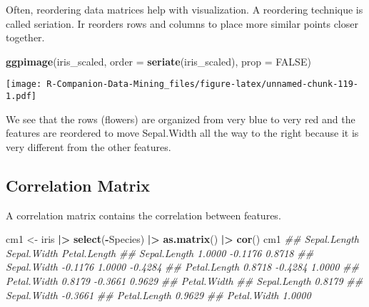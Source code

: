 \documentclass[
  notitlepage]{book}
\newenvironment{Shaded}{\begin{snugshade}}{\end{snugshade}}
\newcommand{\CommentTok}[1]{\textcolor[rgb]{0.56,0.35,0.01}{\textit{#1}}}
\newcommand{\DataTypeTok}[1]{\textcolor[rgb]{0.13,0.29,0.53}{#1}}
\newcommand{\ErrorTok}[1]{\textcolor[rgb]{0.64,0.00,0.00}{\textbf{#1}}}
\newcommand{\KeywordTok}[1]{\textcolor[rgb]{0.13,0.29,0.53}{\textbf{#1}}}
\newcommand{\NormalTok}[1]{#1}
\newcommand{\OperatorTok}[1]{\textcolor[rgb]{0.81,0.36,0.00}{\textbf{#1}}}
\newcommand{\OtherTok}[1]{\textcolor[rgb]{0.56,0.35,0.01}{#1}}
\newcommand{\StringTok}[1]{\textcolor[rgb]{0.31,0.60,0.02}{#1}}
\begin{document}
Often, reordering data matrices help with visualization. A reordering
technique is called seriation. Ir reorders rows and columns to place
more similar points closer together.

\begin{Shaded}
\begin{Highlighting}[]
\KeywordTok{ggpimage}\NormalTok{(iris\_scaled, }\DataTypeTok{order =} \KeywordTok{seriate}\NormalTok{(iris\_scaled), }\DataTypeTok{prop =} \OtherTok{FALSE}\NormalTok{)}
\end{Highlighting}
\end{Shaded}

\texttt{[image: R-Companion-Data-Mining\_files/figure-latex/unnamed-chunk-119-1.pdf]}

We see that the rows (flowers) are organized from very blue to very red
and the features are reordered to move Sepal.Width all the way to the
right because it is very different from the other features.

\hypertarget{correlation-matrix}{%
\subsection{Correlation Matrix}\label{correlation-matrix}}

A correlation matrix contains the correlation between features.

\begin{Shaded}
\begin{Highlighting}[]
\NormalTok{cm1 \textless{}{-}}\StringTok{ }\NormalTok{iris }\OperatorTok{|}\ErrorTok{\textgreater{}}\StringTok{ }
\StringTok{  }\KeywordTok{select}\NormalTok{(}\OperatorTok{{-}}\NormalTok{Species) }\OperatorTok{|}\ErrorTok{\textgreater{}}\StringTok{ }
\StringTok{  }\KeywordTok{as.matrix}\NormalTok{() }\OperatorTok{|}\ErrorTok{\textgreater{}}\StringTok{ }
\StringTok{  }\KeywordTok{cor}\NormalTok{()}
\NormalTok{cm1}
\CommentTok{\#\#              Sepal.Length Sepal.Width Petal.Length}
\CommentTok{\#\# Sepal.Length       1.0000     {-}0.1176       0.8718}
\CommentTok{\#\# Sepal.Width       {-}0.1176      1.0000      {-}0.4284}
\CommentTok{\#\# Petal.Length       0.8718     {-}0.4284       1.0000}
\CommentTok{\#\# Petal.Width        0.8179     {-}0.3661       0.9629}
\CommentTok{\#\#              Petal.Width}
\CommentTok{\#\# Sepal.Length      0.8179}
\CommentTok{\#\# Sepal.Width      {-}0.3661}
\CommentTok{\#\# Petal.Length      0.9629}
\CommentTok{\#\# Petal.Width       1.0000}
\end{Highlighting}
\end{Shaded}
\end{document}
